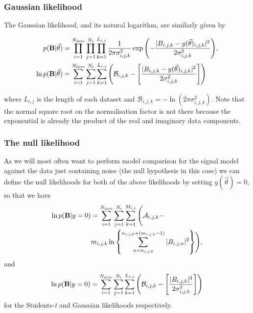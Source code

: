 \subsubsection{Gaussian likelihood}

The Gaussian likelihood, and its natural logarithm, are similarly given by
\begin{widetext}
\begin{align}\label{eq:gausslikelihood}
p(\mathbf{B}|\vec{\theta}) &= \prod_{i=1}^{N_{\rm dets}} \prod_{j=1}^{N_{\rm s}} \prod_{k=1}^{L_{i,j}}
\frac{1}{2\pi\sigma_{i,j,k}^2}\exp{\left(-\frac{|B_{i,j,k}-y(\vec{\theta})_{i,j,k}|^2}{2\sigma_{i,j,k}^2}
\right)}, \nonumber \\
\ln{p(\mathbf{B}|\vec{\theta})} &= \sum_{i=1}^{N_{\rm dets}} \sum_{j=1}^{N_{\rm s}}
\sum_{k=1}^{L_{i,j}} \left(\mathcal{B}_{i,j,k} -
\left[\frac{|B_{i,j,k}-y(\vec{\theta})_{i,j,k}|^2}{2\sigma_{i,j,k}^2 } \right] \right)
\end{align}
\end{widetext}
where $L_{i,j}$ is the length of each dataset and $\mathcal{B}_{i,j,k} = -\ln{(2\pi\sigma_{i,j,k}^2)}$. Note
that the normal square root on the normalisation factor is not there because the exponential is already the
product of the real and imaginary data components.

\subsubsection{The null likelihood}

As we will most often want to perform model comparison for the signal model against the data just containing
noise (the null hypothesis in this case) we can define the null likelihoods for both of the above likelihoods
by setting $y(\vec{\theta}) = 0$, so that we have
\begin{align}
\ln{p(\mathbf{B}|y=0)} &= \sum_{i=1}^{N_{\rm dets}} \sum_{j=1}^{N_{\rm s}}
\sum_{k=1}^{M_{i,j}} \Bigg( \mathcal{A}_{i,j,k} - \nonumber \\
&m_{i,j,k}\ln{
\left\{\sum_{n=n_{i,j,0}}^{n_{i,j,0}+(m_{i,j,k}-1)} |B_{i,j,n}|^2\right\}}
\Bigg),
\end{align}
and
\begin{equation}
\ln{p(\mathbf{B}|y=0)} = \sum_{i=1}^{N_{\rm dets}} \sum_{j=1}^{N_{\rm s}}
\sum_{k=1}^{L_{i,j}} \left(\mathcal{B}_{i,j,k} -
\left[\frac{|B_{i,j,k}|^2}{2\sigma_{i,j,k}^2 } \right] \right)
\end{equation}
for the Students-{\it t} and Gaussian likelihoods respectively.

